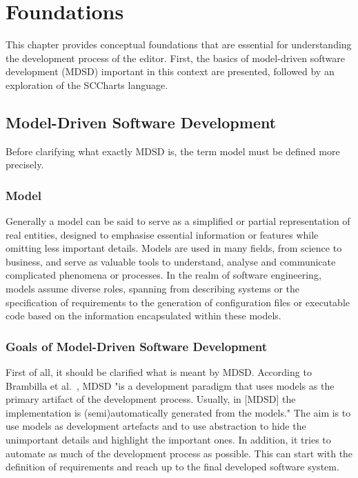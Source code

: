 \chapter{Foundations}\label{chapter_Foundations}
This chapter provides conceptual foundations that are essential for understanding the development process of the editor. First, the basics of model-driven software development (MDSD) important in this context are presented, followed by an exploration of the SCCharts language.
\section{Model-Driven Software Development}\label{Model-Driven Software Development}
Before clarifying what exactly MDSD is, the term model must be defined more precisely.

\subsection{Model}
Generally a model can be said to serve as a simplified or partial representation of real entities, designed to emphasise essential information or features while omitting less important details. Models are used in many fields, from science to business, and serve as valuable tools to understand, analyse and communicate complicated phenomena or processes. In the realm of software engineering, models assume diverse roles, spanning from describing systems or the specification of requirements to the generation of configuration files or executable code based on the information encapsulated within these models.~\cite{Brambilla.2017}

\subsection{Goals of Model-Driven Software Development}
First of all, it should be clarified what is meant by MDSD. According to Brambilla et al.~\cite{Brambilla.2017}, MDSD "is a development paradigm that uses models as the primary artifact of the development process. Usually, in [MDSD] the implementation is (semi)automatically generated from the models." The aim is to use models as development artefacts and to use abstraction to hide the unimportant details and highlight the important ones. In addition, it tries to automate as much of the development process as possible. This can start with the definition of requirements and reach up to the final developed software system.

